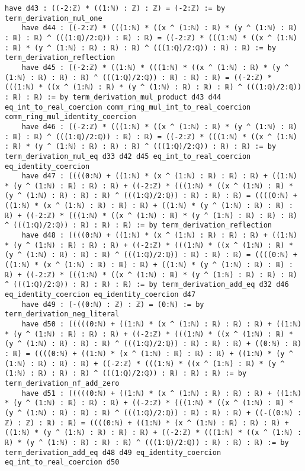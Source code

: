 \documentclass{article}
\begin{document}
\begin{tcolorbox}[colback=white!10, width=\linewidth]
\begin{lstlisting}[language=Lean4]
    have d43 : ((-2:ℤ) * ((1:ℕ) : ℤ) : ℤ) = (-2:ℤ) := by term_derivation_mul_one
    have d44 : ((-2:ℤ) * (((1:ℕ) * ((x ^ (1:ℕ) : ℝ) * (y ^ (1:ℕ) : ℝ) : ℝ) : ℝ) ^ (((1:ℚ)/2:ℚ)) : ℝ) : ℝ) = ((-2:ℤ) * (((1:ℕ) * ((x ^ (1:ℕ) : ℝ) * (y ^ (1:ℕ) : ℝ) : ℝ) : ℝ) ^ (((1:ℚ)/2:ℚ)) : ℝ) : ℝ) := by term_derivation_reflection
    have d45 : ((-2:ℤ) * ((1:ℕ) * (((1:ℕ) * ((x ^ (1:ℕ) : ℝ) * (y ^ (1:ℕ) : ℝ) : ℝ) : ℝ) ^ (((1:ℚ)/2:ℚ)) : ℝ) : ℝ) : ℝ) = ((-2:ℤ) * (((1:ℕ) * ((x ^ (1:ℕ) : ℝ) * (y ^ (1:ℕ) : ℝ) : ℝ) : ℝ) ^ (((1:ℚ)/2:ℚ)) : ℝ) : ℝ) := by term_derivation_mul_product d43 d44 eq_int_to_real_coercion comm_ring_mul_int_to_real_coercion comm_ring_mul_identity_coercion
    have d46 : ((-2:ℤ) * (((1:ℕ) * ((x ^ (1:ℕ) : ℝ) * (y ^ (1:ℕ) : ℝ) : ℝ) : ℝ) ^ (((1:ℚ)/2:ℚ)) : ℝ) : ℝ) = ((-2:ℤ) * (((1:ℕ) * ((x ^ (1:ℕ) : ℝ) * (y ^ (1:ℕ) : ℝ) : ℝ) : ℝ) ^ (((1:ℚ)/2:ℚ)) : ℝ) : ℝ) := by term_derivation_mul_eq d33 d42 d45 eq_int_to_real_coercion eq_identity_coercion
    have d47 : ((((0:ℕ) + ((1:ℕ) * (x ^ (1:ℕ) : ℝ) : ℝ) : ℝ) + ((1:ℕ) * (y ^ (1:ℕ) : ℝ) : ℝ) : ℝ) + ((-2:ℤ) * (((1:ℕ) * ((x ^ (1:ℕ) : ℝ) * (y ^ (1:ℕ) : ℝ) : ℝ) : ℝ) ^ (((1:ℚ)/2:ℚ)) : ℝ) : ℝ) : ℝ) = ((((0:ℕ) + ((1:ℕ) * (x ^ (1:ℕ) : ℝ) : ℝ) : ℝ) + ((1:ℕ) * (y ^ (1:ℕ) : ℝ) : ℝ) : ℝ) + ((-2:ℤ) * (((1:ℕ) * ((x ^ (1:ℕ) : ℝ) * (y ^ (1:ℕ) : ℝ) : ℝ) : ℝ) ^ (((1:ℚ)/2:ℚ)) : ℝ) : ℝ) : ℝ) := by term_derivation_reflection
    have d48 : ((((0:ℕ) + ((1:ℕ) * (x ^ (1:ℕ) : ℝ) : ℝ) : ℝ) + ((1:ℕ) * (y ^ (1:ℕ) : ℝ) : ℝ) : ℝ) + ((-2:ℤ) * (((1:ℕ) * ((x ^ (1:ℕ) : ℝ) * (y ^ (1:ℕ) : ℝ) : ℝ) : ℝ) ^ (((1:ℚ)/2:ℚ)) : ℝ) : ℝ) : ℝ) = ((((0:ℕ) + ((1:ℕ) * (x ^ (1:ℕ) : ℝ) : ℝ) : ℝ) + ((1:ℕ) * (y ^ (1:ℕ) : ℝ) : ℝ) : ℝ) + ((-2:ℤ) * (((1:ℕ) * ((x ^ (1:ℕ) : ℝ) * (y ^ (1:ℕ) : ℝ) : ℝ) : ℝ) ^ (((1:ℚ)/2:ℚ)) : ℝ) : ℝ) : ℝ) := by term_derivation_add_eq d32 d46 eq_identity_coercion eq_identity_coercion d47
    have d49 : (-((0:ℕ) : ℤ) : ℤ) = (0:ℕ) := by term_derivation_neg_literal
    have d50 : (((((0:ℕ) + ((1:ℕ) * (x ^ (1:ℕ) : ℝ) : ℝ) : ℝ) + ((1:ℕ) * (y ^ (1:ℕ) : ℝ) : ℝ) : ℝ) + ((-2:ℤ) * (((1:ℕ) * ((x ^ (1:ℕ) : ℝ) * (y ^ (1:ℕ) : ℝ) : ℝ) : ℝ) ^ (((1:ℚ)/2:ℚ)) : ℝ) : ℝ) : ℝ) + ((0:ℕ) : ℝ) : ℝ) = ((((0:ℕ) + ((1:ℕ) * (x ^ (1:ℕ) : ℝ) : ℝ) : ℝ) + ((1:ℕ) * (y ^ (1:ℕ) : ℝ) : ℝ) : ℝ) + ((-2:ℤ) * (((1:ℕ) * ((x ^ (1:ℕ) : ℝ) * (y ^ (1:ℕ) : ℝ) : ℝ) : ℝ) ^ (((1:ℚ)/2:ℚ)) : ℝ) : ℝ) : ℝ) := by term_derivation_nf_add_zero
    have d51 : (((((0:ℕ) + ((1:ℕ) * (x ^ (1:ℕ) : ℝ) : ℝ) : ℝ) + ((1:ℕ) * (y ^ (1:ℕ) : ℝ) : ℝ) : ℝ) + ((-2:ℤ) * (((1:ℕ) * ((x ^ (1:ℕ) : ℝ) * (y ^ (1:ℕ) : ℝ) : ℝ) : ℝ) ^ (((1:ℚ)/2:ℚ)) : ℝ) : ℝ) : ℝ) + ((-((0:ℕ) : ℤ) : ℤ) : ℝ) : ℝ) = ((((0:ℕ) + ((1:ℕ) * (x ^ (1:ℕ) : ℝ) : ℝ) : ℝ) + ((1:ℕ) * (y ^ (1:ℕ) : ℝ) : ℝ) : ℝ) + ((-2:ℤ) * (((1:ℕ) * ((x ^ (1:ℕ) : ℝ) * (y ^ (1:ℕ) : ℝ) : ℝ) : ℝ) ^ (((1:ℚ)/2:ℚ)) : ℝ) : ℝ) : ℝ) := by term_derivation_add_eq d48 d49 eq_identity_coercion eq_int_to_real_coercion d50

\end{lstlisting}
\end{tcolorbox}
\end{document}
